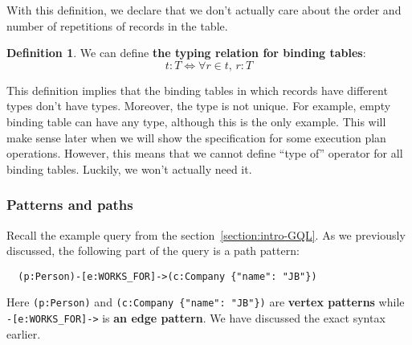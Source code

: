 \documentclass[14pt]{constructor-thesis}
\theoremstyle{definition}
\newtheorem*{definition}{Definition}
\begin{document}
With this definition, we declare that we don't actually care about the order and number of repetitions of records in the table.

\begin{definition}
  We can define \textbf{the typing relation for binding tables}:
  $$ t : T \Longleftrightarrow \forall r \in t, \, r : T $$
\end{definition}

This definition implies that the binding tables in which records have different types don't have types. Moreover, the type is not unique. For example, empty binding table can have any type, although this is the only example. This will make sense later when we will show the specification for some execution plan operations. However, this means that we cannot define ``type of'' operator for all binding tables. Luckily, we won't actually need it.

\subsubsection{Patterns and paths}

Recall the example query from the section~\ref{section:intro-GQL}. As we previously discussed, the following part of the query is a path pattern:
\begin{verbatim}
  (p:Person)-[e:WORKS_FOR]->(c:Company {"name": "JB"})
\end{verbatim}

Here \verb+(p:Person)+ and \verb+(c:Company {"name": "JB"})+ are \textbf{vertex patterns} while \verb+-[e:WORKS_FOR]->+ is \textbf{an edge pattern}. We have discussed the exact syntax earlier.


\end{document}
